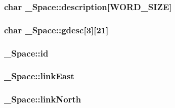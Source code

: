 \subsubsection[{\texorpdfstring{description}{description}}]{\setlength{\rightskip}{0pt plus 5cm}char \+\_\+\+Space\+::description\mbox{[}{\bf W\+O\+R\+D\+\_\+\+S\+I\+ZE}\mbox{]}}\hypertarget{struct__Space_a2a50aacb78d1d0f65f5b14f94ed81d80}{}\label{struct__Space_a2a50aacb78d1d0f65f5b14f94ed81d80}
\subsubsection[{\texorpdfstring{gdesc}{gdesc}}]{\setlength{\rightskip}{0pt plus 5cm}char \+\_\+\+Space\+::gdesc\mbox{[}3\mbox{]}\mbox{[}21\mbox{]}}\hypertarget{struct__Space_a0a71c4c0a4a1698f7d860ba5b80beb7f}{}\label{struct__Space_a0a71c4c0a4a1698f7d860ba5b80beb7f}
\subsubsection[{\texorpdfstring{id}{id}}]{ \+\_\+\+Space\+::id}\hypertarget{struct__Space_a70cb461deb9ac073e401b607339b567f}{}\label{struct__Space_a70cb461deb9ac073e401b607339b567f}
\subsubsection[{\texorpdfstring{link\+East}{linkEast}}]{ \+\_\+\+Space\+::link\+East}\hypertarget{struct__Space_adbf9d4d57d188ef48d3e361fb77a92cf}{}\label{struct__Space_adbf9d4d57d188ef48d3e361fb77a92cf}
\subsubsection[{\texorpdfstring{link\+North}{linkNorth}}]{ \+\_\+\+Space\+::link\+North}\hypertarget{struct__Space_a3f2998ecc940b5cdab73e38188886902}{}\label{struct__Space_a3f2998ecc940b5cdab73e38188886902}
